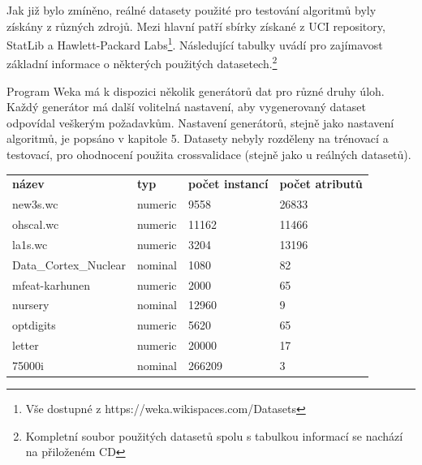 \documentclass[12pt]{article}
\begin{document}
Jak již bylo zmíněno, reálné datasety použité pro testování algoritmů byly získány z různých zdrojů. Mezi hlavní patří sbírky získané z UCI repository, StatLib a Hawlett-Packard Labs\footnote{Vše dostupné z https://weka.wikispaces.com/Datasets}. Následující tabulky uvádí pro zajímavost základní informace o některých použitých datasetech.\footnote{Kompletní soubor použitých datasetů spolu s tabulkou informací se nachází na přiloženém CD}

Program Weka má k dispozici několik generátorů dat pro různé druhy úloh. Každý generátor má další volitelná nastavení, aby vygenerovaný dataset odpovídal veškerým požadavkům. Nastavení generátorů, stejně jako nastavení algoritmů, je popsáno v kapitole 5. Datasety nebyly rozděleny na trénovací a testovací, pro ohodnocení použita crossvalidace (stejně jako u reálných datasetů). 

\begin{table}[h]
\begin{tabular}{  p{4.4cm}  p{1.9cm}  p{3.5cm}  p{3.5cm}  }

{\bf název} &  {\bf typ} & {\bf počet instancí} & {\bf počet atributů} \\

new3s.wc &      numeric &       9558 &      26833 \\

ohscal.wc &     numeric &      11162 &      11466  \\

la1s.wc &    numeric &       3204 &      13196 \\

Data\_Cortex\_Nuclear &      nominal &       1080 &         82  \\

mfeat-karhunen &      numeric &       2000 &         65 \\

nursery &       nominal &      12960 &          9  \\

optdigits &   numeric &       5620 &         65 \\

letter &  numeric &      20000 &         17 \\

75000i &    nominal &     266209 &          3  \\

\end{tabular}
\end{table} 
\end{document}
